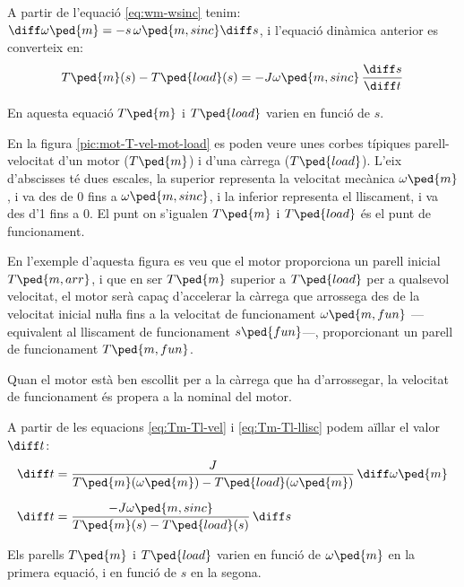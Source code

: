 A partir de l'equació \eqref{eq:wm-wsinc} tenim: $\diff \omega\ped{m} = -s\,\omega\ped{m,sinc} \diff s$, i l'equació dinàmica anterior es converteix en:
\begin{equation}\label{eq:Tm-Tl-llisc}
    T\ped{m}(s) - T\ped{load}(s) = -J \omega\ped{m,sinc}\,\frac{\diff s}{\diff t}
\end{equation}

En aquesta equació $T\ped{m}$ i $T\ped{load}$ varien en funció de $s$.


En la figura \vref{pic:mot-T-vel-mot-load} es poden veure unes corbes típiques parell-velocitat d'un motor ($T\ped{m}$) i d'una  càrrega ($T\ped{load}$). L'eix d'abscisses té dues escales, la superior representa la velocitat mecànica $\omega\ped{m}$, i va des de 0 fins a $\omega\ped{m,sinc}$, i la inferior representa el lliscament, i va des d'1 fins a 0. El punt on s'igualen $T\ped{m}$ i $T\ped{load}$ és el punt  de funcionament.

En l'exemple d'aquesta figura es veu que el motor proporciona un parell inicial $T\ped{m,arr}$, i que en ser $T\ped{m}$  superior a $T\ped{load}$ per a qualsevol velocitat, el motor serà  capaç d'accelerar la càrrega que arrossega des de la velocitat inicial nuŀla fins a la velocitat de funcionament $\omega\ped{m,fun}$ ---equivalent al lliscament de funcionament $s\ped{fun}$---, proporcionant un parell de funcionament $T\ped{m,fun}$.
\begin{center}
    
    \label{pic:mot-T-vel-mot-load}
\end{center}

 Quan el motor està ben escollit per a la càrrega que ha d'arrossegar, la velocitat de funcionament és propera a la nominal del motor.
 
A partir de les equacions \eqref{eq:Tm-Tl-vel} i \eqref{eq:Tm-Tl-llisc} podem aïllar el valor $\diff t$:
\begin{subequations}
\begin{align}
    \diff t &= \frac{J}{T\ped{m}(\omega\ped{m})-T\ped{load}(\omega\ped{m})}\,\diff\omega\ped{m}\\[1.5ex]
    \diff t &= \frac{-J \omega\ped{m,sinc}}{T\ped{m}(s)-T\ped{load}(s)}\,\diff s
\end{align}
\end{subequations}

Els parells $T\ped{m}$ i $T\ped{load}$ varien en funció de $\omega\ped{m}$ en la primera equació, i en funció de $s$ en la segona.

